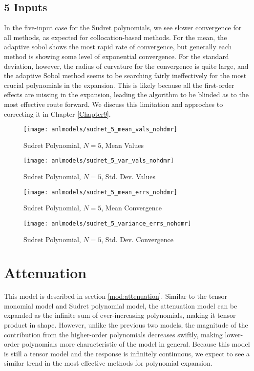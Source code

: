 \subsection{5 Inputs}
In the five-input case for the Sudret polynomials, we see slower convergence for all methods, as expected
for collocation-based methods.  For the mean, the adaptive sobol shows the most rapid rate of convergence,
but generally each method is showing some level of exponential convergence.  For the standard deviation,
however, the radius of curvature for the convergence is quite large, and the adaptive Sobol method seems
to be searching fairly ineffectively for the most crucial polynomials in the expansion.  This is likely
because all the first-order effects are missing in the expansion, leading the algorithm to be blinded as
to the most effective route forward.  We discuss this limitation and approches to correcting it in 
Chapter \ref{Chapter9}.
\begin{figure}[H]
  \centering
  \texttt{[image: anlmodels/sudret\_5\_mean\_vals\_nohdmr]}
  \caption{Sudret Polynomial, $N=5$, Mean Values}
  \label{fig:sudretpoly mean values 5}
\end{figure}
\begin{figure}[H]
  \centering
  \texttt{[image: anlmodels/sudret\_5\_var\_vals\_nohdmr]}
  \caption{Sudret Polynomial, $N=5$, Std. Dev. Values}
  \label{fig:sudretpoly var values 5}
\end{figure}

\begin{figure}[H]
  \centering
  \texttt{[image: anlmodels/sudret\_5\_mean\_errs\_nohdmr]}
  \caption{Sudret Polynomial, $N=5$, Mean Convergence}
  \label{fig:sudretpoly mean errors 5}
\end{figure}
\begin{figure}[H]
  \centering
  \texttt{[image: anlmodels/sudret\_5\_variance\_errs\_nohdmr]}
  \caption{Sudret Polynomial, $N=5$, Std. Dev. Convergence}
  \label{fig:sudretpoly var errors 5}
\end{figure}


\section{Attenuation}
This model is described in section \ref{mod:attenuation}.  Similar to the tensor monomial model and Sudret
polynomial model, the attenuation model can be expanded as the infinite sum of ever-increasing polynomials,
making it tensor product in shape.  However, unlike the previous two models, the magnitude of the contribution
from the higher-order polynomials decreases swiftly, making lower-order polynomials more characteristic of the
model in general.  Because this model is still a tensor model and the response is infinitely continuous,
we expect to see a similar trend in the most effective methods for polynomial expansion.


